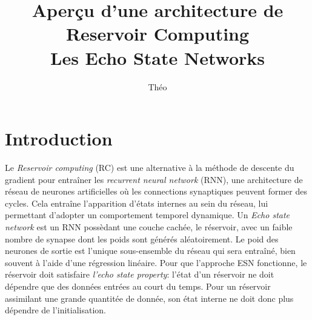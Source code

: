 \documentclass[12pt]{article}
\title{Aperçu d'une architecture de Reservoir Computing\\Les Echo State Networks}
\author{Théo \bsc{Biasutto--Lervat}}
\date{}
\begin{document}
\maketitle


\section{Introduction}
Le \textit{Reservoir computing} (RC) est une alternative à la méthode de descente du gradient pour entraîner les \textit{recurrent neural network} (RNN), une architecture de réseau de neurones artificielles où les connections synaptiques peuvent former des cycles. Cela entraîne l'apparition d'états internes au sein du réseau, lui permettant d'adopter un comportement temporel dynamique.\newline
Un \textit{Echo state network} est un RNN possèdant une couche cachée, le réservoir, avec un faible nombre de synapse dont les poids sont générés aléatoirement. Le poid des neurones de sortie est l'unique sous-ensemble du réseau qui sera entraîné, bien souvent à l'aide d'une régression linéaire.\newline
Pour que l'approche ESN fonctionne, le réservoir doit satisfaire \textit{l'echo state property}: l'état d'un réservoir ne doit dépendre que des données entrées au court du temps. Pour un réservoir assimilant une grande quantitée de donnée, son état interne ne doit donc plus dépendre de l'initialisation.
\end{document}
